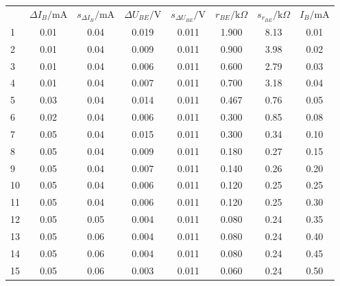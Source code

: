 \begin{center}
    \begin{tabular}{gcccc|ccc}
          &  $\Delta I_{B}/\text{mA}$ &   $s_{\Delta I_{B}}/\text{mA}$ & $\Delta U_{BE}/\text{V}$ &   $s_{\Delta U_{BE}}/\text{V}$ &     $r_{BE}/\text{k} \Omega$ &   $s_{r_{BE}}/\text{k} \Omega$ & $I_B/\text{mA}$ \\     
        1  &     0.01 &         0.04 &     0.019 &         0.011 &  1.900 &      8.13 &  0.01 \\      
        2  &     0.01 &         0.04 &     0.009 &         0.011 &  0.900 &      3.98 &  0.02 \\      
        3  &     0.01 &         0.04 &     0.006 &         0.011 &  0.600 &      2.79 &  0.03 \\      
        4  &     0.01 &         0.04 &     0.007 &         0.011 &  0.700 &      3.18 &  0.04 \\      
        5  &     0.03 &         0.04 &     0.014 &         0.011 &  0.467 &      0.76 &  0.05 \\      
        6  &     0.02 &         0.04 &     0.006 &         0.011 &  0.300 &      0.85 &  0.08 \\      
        7  &     0.05 &         0.04 &     0.015 &         0.011 &  0.300 &      0.34 &  0.10 \\      
        8  &     0.05 &         0.04 &     0.009 &         0.011 &  0.180 &      0.27 &  0.15 \\      
        9  &     0.05 &         0.04 &     0.007 &         0.011 &  0.140 &      0.26 &  0.20 \\      
        10 &     0.05 &         0.04 &     0.006 &         0.011 &  0.120 &      0.25 &  0.25 \\      
        11 &     0.05 &         0.04 &     0.006 &         0.011 &  0.120 &      0.25 &  0.30 \\      
        12 &     0.05 &         0.05 &     0.004 &         0.011 &  0.080 &      0.24 &  0.35 \\      
        13 &     0.05 &         0.06 &     0.004 &         0.011 &  0.080 &      0.24 &  0.40 \\      
        14 &     0.05 &         0.06 &     0.004 &         0.011 &  0.080 &      0.24 &  0.45 \\      
        15 &     0.05 &         0.06 &     0.003 &         0.011 &  0.060 &      0.24 &  0.50 \\      

\end{tabular}
\end{center}
